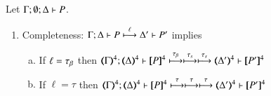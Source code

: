 \documentclass[runningheads]{llncs}
\begin{document}
{\begin{proposition}\myrm
	\label{prop:op_corr_pHOp_to_HOp}
Let $\Gamma; \emptyset; \Delta \vdash P$.
	\begin{enumerate}[1.]
		\item	Completeness: 
			$\Gamma; \Delta \vdash P \stackrel{\ell}{\longmapsto} \Delta' \vdash P'$ implies
%
			\begin{enumerate}[a)]
%
%
%

				\item	If $\ell = \tau_{\beta}$ then %
					$\horel{\tmap{\Gamma}{4}}{\tmap{\Delta}{4}}{\pmap{P}{4}}{\hby{\btau} \hby{\stau}  \hby{\stau}}
					{\tmap{\Delta'}{4}}{\pmap{P'}{4}}$ %

				\item	If $\ell = \tau$ then %
					$\horel{\tmap{\Gamma}{4}}{\tmap{\Delta}{4}}{\pmap{P}{4}}{\hby{\tau}\hby{\tau} \hby{\tau}}
					{\tmap{\Delta'}{4}}{\pmap{P'}{4}}$ %
			\end{enumerate}


\end{enumerate}
\end{proposition}}
\end{document}
